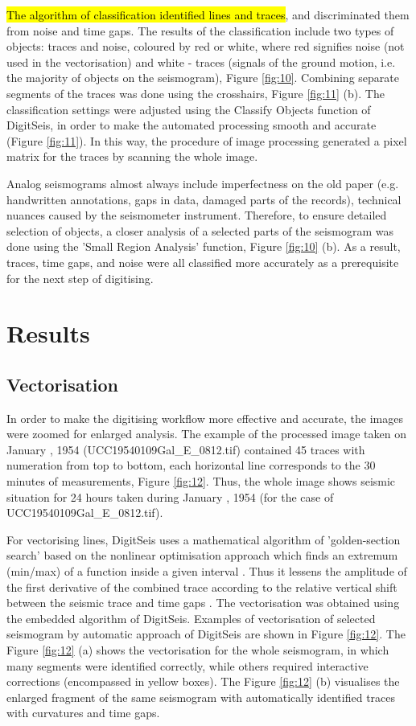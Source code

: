 \documentclass[sensors,article,submit,moreauthors,pdftex]{Definitions/mdpi}
\begin{document}
\hl{The algorithm of classification identified lines and traces}, and discriminated them from noise and time gaps. The results of the classification include two types of objects: traces and noise, coloured by red or white, where red signifies noise (not used in the vectorisation) and white - traces (signals of the ground motion, i.e. the majority of objects on the seismogram), Figure \ref{fig:10}. Combining separate segments of the traces was done using the crosshairs, Figure \ref{fig:11} (b). The classification settings were adjusted using the Classify Objects function of DigitSeis, in order to make the automated processing smooth and accurate (Figure \ref{fig:11}). In this way, the procedure of image processing generated a pixel matrix for the traces by scanning the whole image.  

Analog seismograms almost always include imperfectness on the old paper (e.g. handwritten annotations, gaps in data, damaged parts of the records), technical nuances caused by the seismometer instrument. Therefore, to ensure detailed selection of objects, a closer analysis of a selected parts of the seismogram was done using the 'Small Region Analysis' function, Figure \ref{fig:10} (b). As a result, traces, time gaps, and noise were all classified more accurately as a prerequisite for the next step of digitising. 

\section{Results}

\subsection{Vectorisation}
In order to make the digitising workflow more effective and accurate, the images were zoomed for enlarged analysis. The example of the processed image taken on January , 1954 (UCC19540109Gal\_E\_0812.tif) contained 45 traces with numeration from top to bottom, each horizontal line corresponds to the 30 minutes of measurements, Figure \ref{fig:12}. Thus, the whole image shows seismic situation for 24 hours taken during January , 1954 (for the case of UCC19540109Gal\_E\_0812.tif).

For vectorising lines, DigitSeis uses a mathematical algorithm of 'golden-section search' based on the nonlinear optimisation approach which finds an extremum (min/max) of a function inside a given interval \cite{Kiefer,Press}. Thus it lessens the amplitude of the first derivative of the combined trace according to the relative vertical shift between the seismic trace and time gaps \cite{BogiatzisIshii2016}. The vectorisation was obtained using the embedded algorithm of DigitSeis. Examples of vectorisation of selected seismogram by automatic approach of DigitSeis are shown in Figure \ref{fig:12}. The Figure \ref{fig:12} (a) shows the vectorisation for the whole seismogram, in which many segments were identified correctly, while others required interactive corrections (encompassed in yellow boxes). The Figure \ref{fig:12} (b) visualises the enlarged fragment of the same seismogram with automatically identified traces with curvatures and time gaps. 
\end{document}

